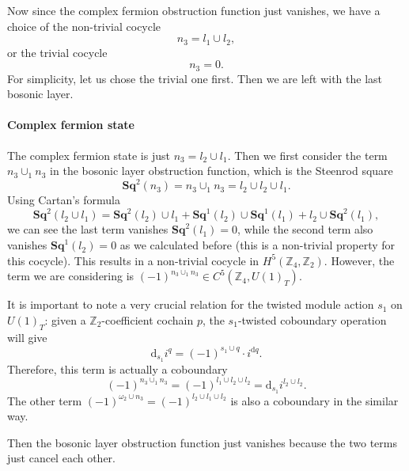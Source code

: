 \documentclass[%
 reprint,
 amsmath,amssymb,
 aps,
prb,
]{revtex4-2}
\begin{document}
Now since the complex fermion obstruction function just vanishes, we have a choice of the non-trivial cocycle 
\begin{equation}
n_3 = l_1 \cup l_2 ,
\end{equation}
or the trivial cocycle 
\begin{equation}
n_3 = 0 .
\end{equation}
For simplicity, let us chose the trivial one first.
Then we are left with the last bosonic layer.

\paragraph{Complex fermion state} The complex fermion state is just $n_3 = l_2 \cup l_1$.
Then we first consider the term $n_3 \cup_1 n_3$ in the bosonic layer obstruction function, which is the Steenrod square
\begin{equation}
\mathbf {Sq}^2(n_3) = n_3 \cup_1 n_3 = l_2 \cup l_2 \cup l_1 .
\end{equation}
Using Cartan's formula
\begin{equation}
\mathbf {Sq}^2(l_2 \cup l_1) = \mathbf {Sq}^2(l_2) \cup l_1 + \mathbf {Sq}^1(l_2) \cup \mathbf {Sq}^1(l_1) + l_2 \cup \mathbf {Sq}^2(l_1) ,
\end{equation}
we can see the last term vanishes $\mathbf {Sq}^2(l_1) = 0$, while the second term also vanishes $\mathbf {Sq}^1(l_2) = 0$ as we calculated before (this is a non-trivial property for this cocycle).
This results in a non-trivial cocycle in $H^5(\mathbb Z_4, \mathbb Z_2)$.
However, the term we are considering is $(-1)^{n_3 \cup_1 n_3} \in C^5(\mathbb Z_4, U(1)_T)$.

It is important to note a very crucial relation for the twisted module action $s_1$ on $U(1)_T$: given a $\mathbb Z_2$-coefficient cochain $p$, the $s_1$-twisted coboundary operation will give 
\begin{equation}
\mathrm{d}_{s_1} i ^{q} = (-1)^{s_1 \cup q} \cdot i^{\mathrm{d} q} .
\end{equation}
Therefore, this term is actually a coboundary 
\begin{equation}
(-1)^{n_3 \cup_1 n_3} = (-1)^{l_1 \cup l_2 \cup l_2} = \mathrm{d}_{s_1} i^{l_2 \cup l_2} .
\end{equation}
The other term $(-1)^{\omega_2 \cup n_3} = (-1)^{l_2 \cup l_1 \cup l_2}$ is also a coboundary in the similar way.

Then the bosonic layer obstruction function just vanishes because the two terms just cancel each other.
\end{document}
